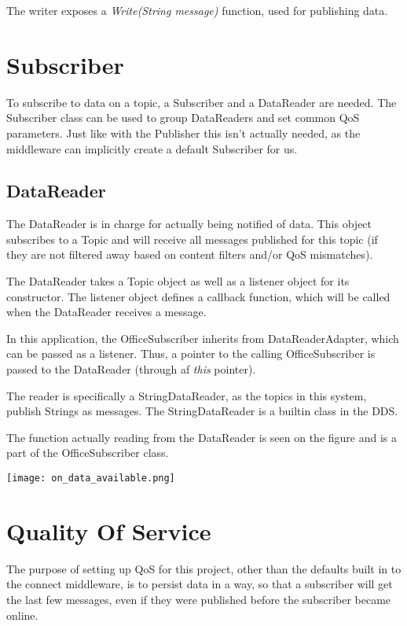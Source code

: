 The writer exposes a \textit{Write(String message)} function, used for publishing data.

\section{Subscriber}
To subscribe to data on a topic, a Subscriber and a DataReader are needed. The Subscriber class can be used to group DataReaders and set common QoS parameters. Just like with the Publisher this isn't actually needed, as the middleware can implicitly create a default Subscriber for us. 

\subsection{DataReader}
The DataReader is in charge for actually being notified of data. This object subscribes to a Topic and will receive all messages published for this topic (if they are not filtered away based on content filters and/or QoS mismatches). 

The DataReader takes a Topic object as well as a listener object for its constructor. The listener object defines a callback function, which will be called when the DataReader receives a message.

In this application, the OfficeSubscriber inherits from DataReaderAdapter, which can be passed as a listener. Thus, a pointer to the calling OfficeSubscriber is passed to the DataReader (through af \textit{this} pointer).

The reader is specifically a StringDataReader, as the topics in this system, publish Strings as messages. The StringDataReader is a builtin class in the DDS. 

 \begin{center}
\end{center}

The function actually reading from the DataReader is seen on the figure and is a part of the OfficeSubscriber class.

\begin{center}
	\texttt{[image: on\_data\_available.png]}
\end{center}

\section{Quality Of Service}
The purpose of setting up QoS for this project, other than the defaults built in to the connect middleware, is to persist data in a way, so that a subscriber will get the last few messages, even if they were published before the subscriber became online.

